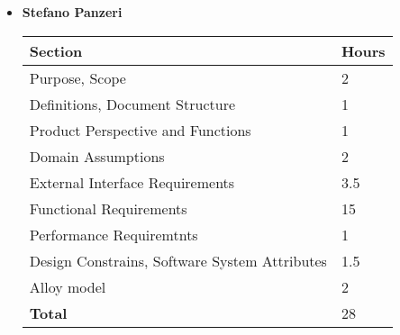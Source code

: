 \begin{itemize}
\item \textbf{Stefano Panzeri}

\begin{table}[!h]
\centering
\begin{tabular}{|l|l|}
\hline
 \textbf{Section}														&		\textbf{Hours}  \\ \hline
Purpose, Scope														& 2 	\\ \hline
Definitions, Document Structure							& 1 	\\ \hline
Product Perspective and Functions						& 1 	\\ \hline
Domain Assumptions												&  2	\\ \hline
External Interface Requirements							& 3.5 	\\ \hline
Functional Requirements										& 15 	\\ \hline
Performance Requiremtnts									&  1	\\ \hline
Design Constrains, Software System Attributes	&  1.5	\\ \hline
Alloy model   &   2    \\ \hline
\textbf{Total}															& 28 	\\ \hline
\end{tabular}
\end{table}


\end{itemize}
